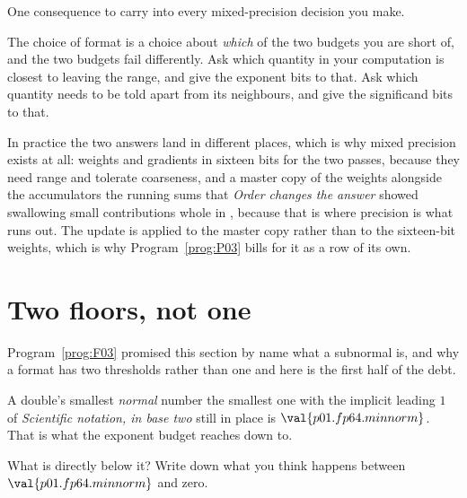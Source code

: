 \begin{fr}

One consequence to carry into every mixed-precision decision you make.

The choice of format is a choice about \emph{which} of the two budgets you
are short of, and the two budgets fail differently. Ask which quantity in your
computation is closest to leaving the range, and give the exponent bits to
that. Ask which quantity needs to be told apart from its neighbours, and give
the significand bits to that.

In practice the two answers land in different places, which is why mixed
precision exists at all: weights and gradients in sixteen bits for the two
passes, because they need range and tolerate coarseness, and a master copy of
the weights alongside the accumulators \dash{} the running sums that
\emph{Order changes the answer} showed swallowing small contributions whole
\dash{} in , because that is where precision is what runs out. The
update is applied to the master copy rather than to the sixteen-bit weights,
which is why Program~\ref{prog:P03} bills for it as a row of its own.
\end{fr}

\section{Two floors, not one}
\label{sec:P01-floors}

\begin{fr}
Program~\ref{prog:F03} promised this section by name \dash{} what a subnormal
is, and why a format has two thresholds rather than one \dash{} and here is the
first half of the debt.

A double's smallest \emph{normal} number \dash{} the smallest one with the
implicit leading $1$ of \emph{Scientific notation, in base two} still in place
\dash{} is $\val{p01.fp64.minnorm}$. That is what the exponent budget reaches
down to.

What is directly below it? Write down what you think happens between
$\val{p01.fp64.minnorm}$ and zero.
\nextframe
\end{fr}


